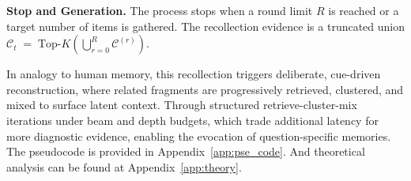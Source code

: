 \textbf{Stop and Generation.}
The process stops when a round limit $R$ is reached or a target number of items is gathered. The recollection evidence is a truncated union $\mathcal{C}_t \;=\; \text{Top-}K \!\left(\bigcup_{r=0}^{R}\mathcal{C}^{(r)}\right)$.

In analogy to human memory, this recollection triggers deliberate, cue-driven reconstruction, where related fragments are progressively retrieved, clustered, and mixed to surface latent context. Through structured retrieve-cluster-mix iterations under beam and depth budgets, which trade additional latency for more diagnostic evidence, enabling the evocation of question-specific memories. The pseudocode is provided in Appendix~\ref{app:pse_code}. And theoretical analysis can be found at Appendix~\ref{app:theory}.

